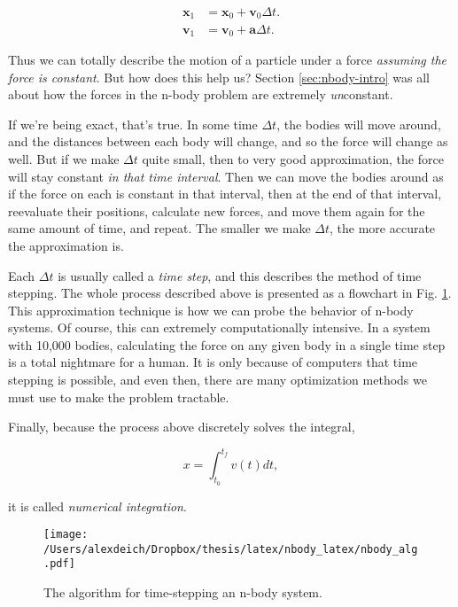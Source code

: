 \documentclass[11pt]{article}
\begin{document}
\begin{align*}
\mathbf{x}_1&=\mathbf{x}_0 + \mathbf{v}_0 \Delta t.\\
\mathbf{v}_1&=\mathbf{v}_0 + \mathbf{a} \Delta t.
\end{align*}

Thus we can totally describe the motion of a particle under a force \emph{assuming the force is constant}.  But how does this help us?  Section \ref{sec:nbody-intro} was all about how the forces in the n-body problem are extremely \emph{un}constant.  

If we're being exact, that's true.  In some time $\Delta t$, the bodies will move around, and the distances between each body will change, and so the force will change as well.  But if we make $\Delta t$ quite small, then to very good approximation, the force will stay constant \emph{in that time interval}.  Then we can move the bodies around as if the force on each is constant in that interval, then at the end of that interval, reevaluate their positions, calculate new forces, and move them again for the same amount of time, and repeat.   The smaller we make $\Delta t$, the more accurate the approximation is.

Each $\Delta t$ is usually called a \emph{time step}, and this describes the method of time stepping.  The whole process described above is presented as a flowchart in Fig. \ref{fig:nbody_flow}.  This approximation technique is how we can probe the behavior of n-body systems.  Of course, this can extremely computationally intensive.  In a system with 10,000 bodies, calculating the force on any given body in a single time step is a total nightmare for a human.  It is only because of computers that time stepping is possible, and even then, there are many optimization methods we must use to make the problem tractable.

Finally, because the process above discretely solves the integral,

\begin{equation}
x = \int_{t_0}^{t_f} v(t)dt,
\end{equation}

it is called \emph{numerical integration}.

\begin{figure}[ht]
\begin{center}
\texttt{[image: /Users/alexdeich/Dropbox/thesis/latex/nbody\_latex/nbody\_alg.pdf]}
\caption{The algorithm for time-stepping an n-body system.}
\label{fig:nbody_flow}
\end{center}
\end{figure}
\newpage
\end{document}
